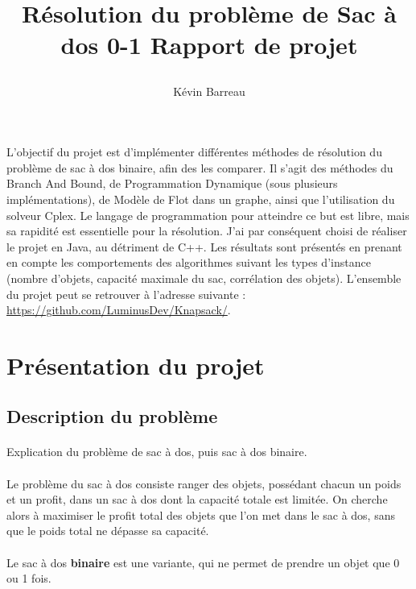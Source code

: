 \documentclass[12pt]{article}
\title{
 \begin{minipage}\linewidth
        \centering
        Résolution du problème de Sac à dos 0-1
        \vskip3pt
        \large Rapport de projet
    \end{minipage}
 }
\author{Kévin Barreau}
\begin{document}
\maketitle

\abstract
L'objectif du projet est d'implémenter différentes méthodes de résolution du problème de sac à dos binaire, afin des les comparer. Il s'agit des méthodes du Branch And Bound, de Programmation Dynamique (sous plusieurs implémentations), de Modèle de Flot dans un graphe, ainsi que l'utilisation du solveur Cplex. Le langage de programmation pour atteindre ce but est libre, mais sa rapidité est essentielle pour la résolution. J'ai par conséquent choisi de réaliser le projet en Java, au détriment de C++. Les résultats sont présentés en prenant en compte les comportements des algorithmes suivant les types d'instance (nombre d'objets, capacité maximale du sac, corrélation des objets). L'ensemble du projet peut se retrouver à l'adresse suivante : \url{https://github.com/LuminusDev/Knapsack/}.

\newpage

\renewcommand{\contentsname}{Sommaire} 
\tableofcontents

\newpage

\section{Présentation du projet}

\subsection{Description du problème}

\paragraph{}Explication du problème de sac à dos, puis sac à dos binaire.

\paragraph{}Le problème du sac à dos consiste ranger des objets, possédant chacun un poids et un profit, dans un sac à dos dont la capacité totale est limitée. On cherche alors à maximiser le profit total des objets que l'on met dans le sac à dos, sans que le poids total ne dépasse sa capacité.
\paragraph{}Le sac à dos \textbf{binaire} est une variante, qui ne permet de prendre un objet que 0 ou 1 fois.
\end{document}
